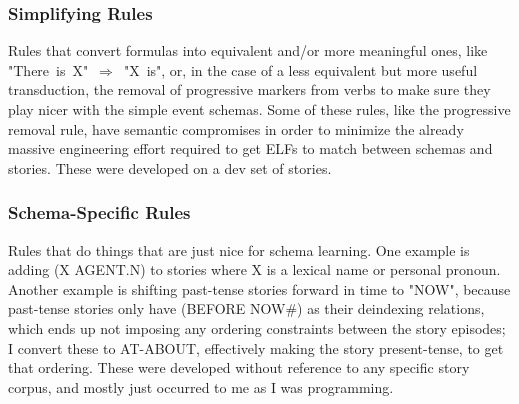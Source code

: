 \subsubsection{Simplifying Rules}
Rules that convert formulas into equivalent and/or more meaningful ones, like "There~is~X"~$\Rightarrow$~"X~is", or, in the case of a less equivalent but more useful transduction, the removal of progressive markers from verbs to make sure they play nicer with the simple event schemas. Some of these rules, like the progressive removal rule, have semantic compromises in order to minimize the already massive engineering effort required to get ELFs to match between schemas and stories. These were developed on a dev set of stories.

\subsubsection{Schema-Specific Rules}
Rules that do things that are just nice for schema learning. One example is adding (X AGENT.N) to stories where X is a lexical name or personal pronoun. Another example is shifting past-tense stories forward in time to "NOW", because past-tense stories only have (BEFORE NOW\#) as their deindexing relations, which ends up not imposing any ordering constraints between the story episodes; I convert these to AT-ABOUT, effectively making the story present-tense, to get that ordering. These were developed without reference to any specific story corpus, and mostly just occurred to me as I was programming.

